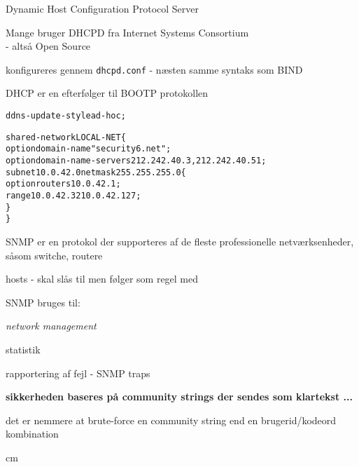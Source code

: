 \documentclass[Screen16to9,17pt]{foils}
\begin{document}

\begin{list1}
\item Dynamic Host Configuration Protocol Server
\item Mange bruger DHCPD fra Internet Systems Consortium\\
   - altså Open Source
\item konfigureres gennem \verb+dhcpd.conf+ - næsten samme syntaks som BIND
\item DHCP er en efterfølger til BOOTP protokollen
\end{list1}

\begin{alltt}
\small
ddns-update-style ad-hoc;

shared-network LOCAL-NET \{
    option  domain-name "security6.net";
    option  domain-name-servers 212.242.40.3, 212.242.40.51;
    subnet 10.0.42.0 netmask 255.255.255.0 \{
            option routers 10.0.42.1;
            range 10.0.42.32 10.0.42.127;
    \}
\}
\end{alltt}







\begin{list1}
\item SNMP er en protokol der supporteres af de fleste professionelle
  netværksenheder, såsom switche, routere
\item hosts - skal slås til men følger som regel med
\item SNMP bruges til:
  \begin{list2}
    \item \emph{network management}
    \item statistik
    \item rapportering af fejl - SNMP traps
  \end{list2}
\item {\bfseries sikkerheden baseres på community strings der sendes
    som klartekst ...}
\item det er nemmere at brute-force en community string end en
  brugerid/kodeord kombination
\end{list1}


 cm
\end{document}
